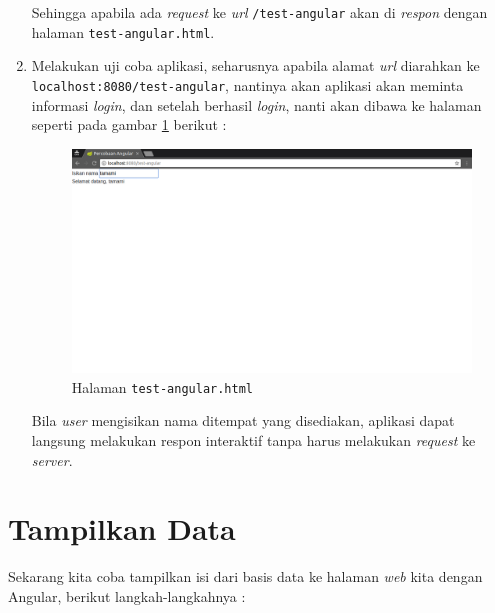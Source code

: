 \begin{enumerate}
	Sehingga apabila ada \textit{request} ke \textit{url} \texttt{/test-angular}	 akan di \textit{respon} dengan halaman \texttt{test-angular.html}.
	
	\item Melakukan uji coba aplikasi, seharusnya apabila alamat \textit{url} diarahkan ke \texttt{localhost:8080/test-angular}, nantinya akan aplikasi akan meminta informasi \textit{login}, dan setelah berhasil \textit{login}, nanti akan dibawa ke halaman seperti pada gambar \ref{fig:halaman-test-angular} berikut :
	
	\begin{figure}[H]
		\centering
		\includegraphics[width=1\textwidth]{./resources/027-test-angular}
		\caption{Halaman \texttt{test-angular.html}}
		\label{fig:halaman-test-angular}
	\end{figure}
	
	Bila \textit{user} mengisikan nama ditempat yang disediakan, aplikasi dapat langsung melakukan respon interaktif tanpa harus melakukan \textit{request} ke \textit{server}.	
	
\end{enumerate}


\section{Tampilkan Data}

Sekarang kita coba tampilkan isi dari basis data ke halaman \textit{web} kita dengan Angular, berikut langkah-langkahnya :

